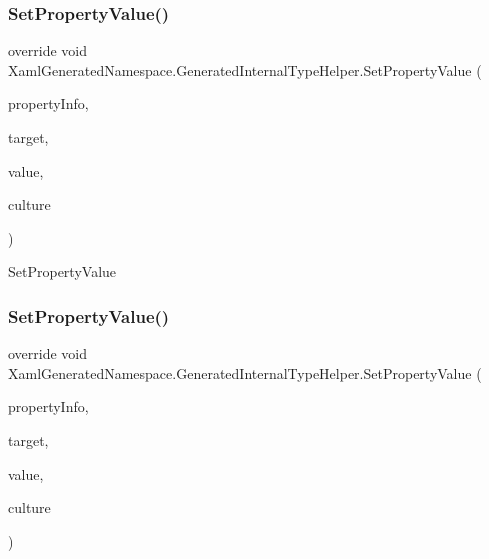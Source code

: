 \subsubsection{\texorpdfstring{Set\+Property\+Value()}{SetPropertyValue()}\hspace{0.1cm}{\footnotesize\ttfamily [2/4]}}
{\footnotesize\ttfamily override void Xaml\+Generated\+Namespace.\+Generated\+Internal\+Type\+Helper.\+Set\+Property\+Value (\begin{DoxyParamCaption}\item[{System.\+Reflection.\+Property\+Info}]{property\+Info,  }\item[{object}]{target,  }\item[{object}]{value,  }\item[{System.\+Globalization.\+Culture\+Info}]{culture }\end{DoxyParamCaption})\hspace{0.3cm}{\ttfamily [protected]}}



Set\+Property\+Value 

\mbox{\label{class_xaml_generated_namespace_1_1_generated_internal_type_helper_ade0f04c0f7b18dd5b170e071d5534d38}} 
\subsubsection{\texorpdfstring{Set\+Property\+Value()}{SetPropertyValue()}\hspace{0.1cm}{\footnotesize\ttfamily [3/4]}}
{\footnotesize\ttfamily override void Xaml\+Generated\+Namespace.\+Generated\+Internal\+Type\+Helper.\+Set\+Property\+Value (\begin{DoxyParamCaption}\item[{System.\+Reflection.\+Property\+Info}]{property\+Info,  }\item[{object}]{target,  }\item[{object}]{value,  }\item[{System.\+Globalization.\+Culture\+Info}]{culture }\end{DoxyParamCaption})\hspace{0.3cm}{\ttfamily [protected]}}



